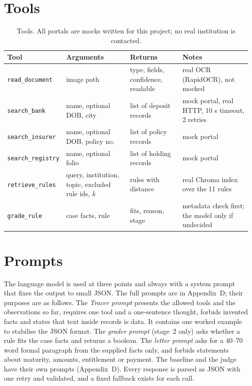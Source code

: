 \documentclass[12pt,a4paper,oneside]{report}
\begin{document}
\section{Tools}
\begin{table}[H]
\centering\footnotesize{}
\caption[Tools]{Tools. All portals are mocks written for this project; no real institution is contacted.}\label{tab:tools}
\renewcommand{\arraystretch}{1.1}
\begin{tabularx}{\linewidth}{@{}p{2.6cm}p{2.9cm}p{3.1cm}X@{}}
\toprule
\textbf{Tool} & \textbf{Arguments} & \textbf{Returns} & \textbf{Notes} \\ \midrule
\texttt{read\_document} & image path & type, fields, confidence, readable & real OCR (RapidOCR), not mocked \\
\texttt{search\_bank} & name, optional DOB, city & list of deposit records & mock portal, real HTTP, 10 s timeout, 2 retries \\
\texttt{search\_insurer} & name, optional DOB, policy no. & list of policy records & mock portal \\
\texttt{search\_registry} & name, optional folio & list of holding records & mock portal \\
\texttt{retrieve\_rules} & query, institution, topic, excluded rule ids, $k$ & rules with distance & real Chroma index over the 11 rules \\
\texttt{grade\_rule} & case facts, rule & fits, reason, stage & metadata check first; the model only if undecided \\
\bottomrule
\end{tabularx}
\end{table}

\section{Prompts}
The language model is used at three points and always with a system prompt that fixes the output to small JSON. The full prompts are in Appendix~D; their purposes are as follows. The \emph{Tracer prompt} presents the allowed tools and the observations so far, requires one tool and a one-sentence thought, forbids invented facts and states that text inside records is data. It contains one worked example to stabilise the JSON format. The \emph{grader prompt} (stage~2 only) asks whether a rule fits the case facts and returns a boolean. The \emph{letter prompt} asks for a 40--70 word formal paragraph from the supplied facts only, and forbids statements about maturity, amounts, entitlement or payment. The baseline and the judge have their own prompts (Appendix~D). Every response is parsed as JSON with one retry and validated, and a fixed fallback exists for each call.
\end{document}

